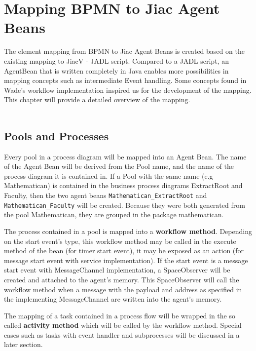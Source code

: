\chapter{Mapping BPMN to Jiac Agent Beans}
\label{chap:mapping}
The element mapping from BPMN to Jiac Agent Beans is created based on the existing mapping to JiacV - JADL script. Compared to a JADL script, an AgentBean that is written completely in Java enables more possibilities in mapping concepts such as intermediate Event handling. Some concepts found in Wade's workflow implementation inspired us for the development of the mapping. This chapter will provide a detailed overview of the mapping.\\\\

\section{Pools and Processes}
Every pool in a process diagram will be mapped into an Agent Bean. The name of the Agent Bean will be derived from the Pool name, and the name of the process diagram it is contained in. If a Pool with the same name (e.g Mathematican) is contained in the business process diagrams ExtractRoot and Faculty, then the two agent beans \texttt{Mathematican\_ExtractRoot} and \texttt{Mathematican\_Faculty} will be created. Because they were both generated from the pool Mathematican, they are grouped in the package mathematican. 

The process contained in a pool is mapped into a \textbf{workflow method}. Depending on the start event's type, this workflow method may be called in the execute method of the bean (for timer start event), it may be exposed as an action (for message start event with service implementation). If the start event is a message start event with MessageChannel implementation, a SpaceObserver will be created and attached to the agent's memory. This SpaceObserver will call the workflow method when a message with the payload and address as specified in the implementing MessageChannel are written into the agent's memory.

The mapping of a task contained in a process flow will be wrapped in the so called \textbf{activity method} which will be called by the workflow method. Special cases such as tasks with event handler and subprocesses will be discussed in a later section.

